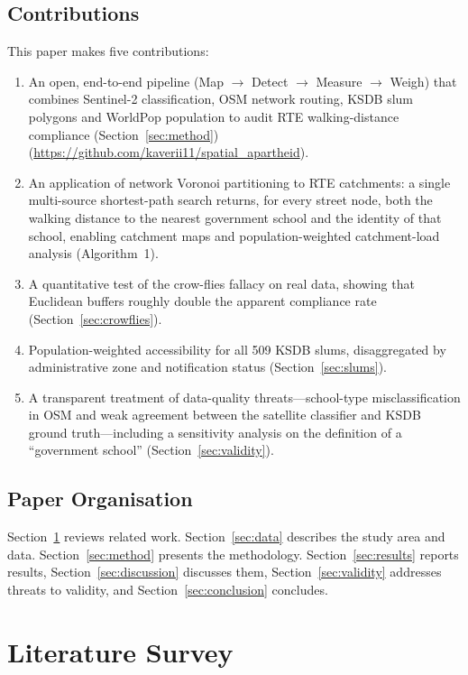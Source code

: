 \documentclass[conference]{IEEEtran}
\begin{document}
\subsection{Contributions}
This paper makes five contributions:
\begin{enumerate}
\item An open, end-to-end pipeline (Map $\rightarrow$ Detect $\rightarrow$ Measure $\rightarrow$ Weigh) that combines Sentinel-2 classification, OSM network routing, KSDB slum polygons and WorldPop population to audit RTE walking-distance compliance (Section~\ref{sec:method}) (\url{https://github.com/kaverii11/spatial_apartheid}).
\item An application of network Voronoi partitioning \cite{erwig2000,okabe2008} to RTE catchments: a single multi-source shortest-path search returns, for every street node, both the walking distance to the nearest government school and the identity of that school, enabling catchment maps and population-weighted catchment-load analysis (Algorithm~1).
\item A quantitative test of the crow-flies fallacy on real data, showing that Euclidean buffers roughly double the apparent compliance rate (Section~\ref{sec:crowflies}).
\item Population-weighted accessibility for all 509 KSDB slums, disaggregated by administrative zone and notification status (Section~\ref{sec:slums}).
\item A transparent treatment of data-quality threats---school-type misclassification in OSM and weak agreement between the satellite classifier and KSDB ground truth---including a sensitivity analysis on the definition of a ``government school'' (Section~\ref{sec:validity}).
\end{enumerate}

\subsection{Paper Organisation}
Section~\ref{sec:lit} reviews related work. Section~\ref{sec:data} describes the study area and data. Section~\ref{sec:method} presents the methodology. Section~\ref{sec:results} reports results, Section~\ref{sec:discussion} discusses them, Section~\ref{sec:validity} addresses threats to validity, and Section~\ref{sec:conclusion} concludes.

\section{Literature Survey}\label{sec:lit}
\end{document}
